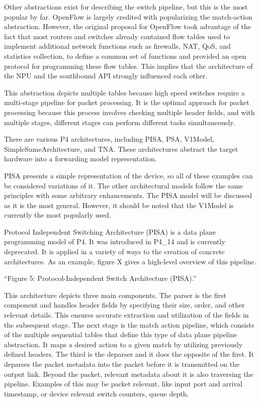 Other abstractions exist for describing the switch pipeline, but this is the most popular by far. OpenFlow is largely credited with popularizing the match-action abstraction\cite{bifulco_survey_2018}. However, the original proposal for OpenFlow took advantage of the fact that most routers and switches already contained flow tables used to implement additional network functions such as firewalls, NAT, QoS, and statistics collection, to define a common set of functions and provided an open protocol for programming these flow tables\cite{mckeown_openflow_2008}. This implies that the architecture of the NPU and the southbound API strongly influenced each other.

This abstraction depicts multiple tables because high speed switches require a multi-stage pipeline for packet processing. It is the optimal approach for packet processing because this process involves checking multiple header fields, and with multiple stages, different stages can perform different tasks simultaneously. \cite{peterson_software-defined_2021}

There are various P4 architectures, including PISA, PSA, V1Model, SimpleSumeArchitecture, and TNA\cite{peterson_software-defined_2021}\cite{hauser_survey_2021}. These architectures abstract the target hardware into a forwarding model representation. 

PISA presents a simple representation of the device, so all of these examples can be considered variations of it. The other architectural models follow the same principles with some arbitrary enhancements. The PISA model will be discussed as it is the most general. However, it should be noted that the V1Model is currently the most popularly used.

Protocol Independent Switching Architecture (PISA) is a data plane programming model of P4. It was introduced in P4\_14 and is currently deprecated. It is applied in a variety of ways to the creation of concrete architectures\cite{hauser_survey_2021}. As an example, figure X gives a high-level overview of this pipeline. 

“Figure 5: Protocol-Independent Switch Architecture (PISA).” \cite{hauser_survey_2021}

This architecture depicts three main components. The parser is the first component and handles header fields by specifying their size, order, and other relevant details. This ensures accurate extraction and utilization of the fields in the subsequent stage. The next stage is the match action pipeline, which consists of the multiple sequential tables that define this type of data plane pipeline abstraction. It maps a desired action to a given match by utilizing previously defined headers. The third is the deparser and it does the opposite of the first. It deparses the packet metadata into the packet before it is transmitted on the output link. Beyond the packet, relevant metadata about it is also traversing the pipeline. Examples of this may be packet relevant, like input port and arrival timestamp, or device relevant switch counters, queue depth. \cite{peterson_software-defined_2021}

